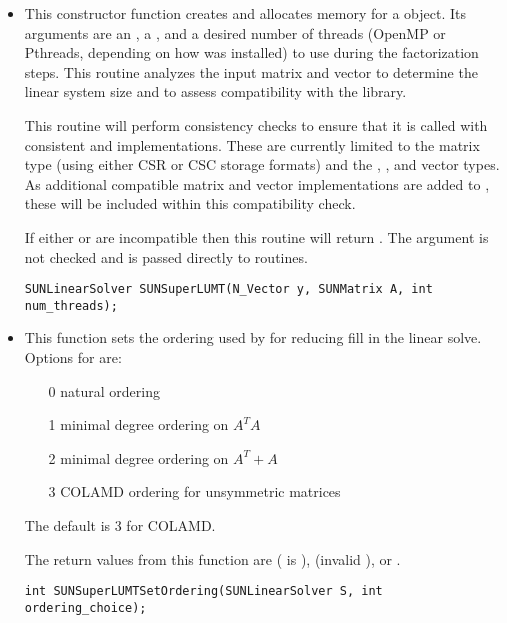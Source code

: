 \begin{itemize}


\item {}

  This constructor function creates and allocates memory for a {\sunlinsolslumt}
  object.  Its arguments are an {\nvector}, a {\sunmatrix}, and a
  desired number of threads (OpenMP or Pthreads, depending on how
  {\superlumt} was installed) to use during the factorization steps.
  This routine analyzes the input matrix and vector to determine the
  linear system size and to assess compatibility with the {\superlumt}
  library.

  This routine will perform consistency checks to ensure that it is
  called with consistent {\nvector} and {\sunmatrix} implementations.
  These are currently limited to the {\sunmatsparse} matrix type
  (using either CSR or CSC storage formats) and the {\nvecs},
  {\nvecopenmp}, and {\nvecpthreads} vector types.  As additional
  compatible matrix and vector implementations are added to
  {\sundials}, these will be included within this compatibility
  check. 

  If either  or  are incompatible then this routine will
  return .  The  argument is not checked
  and is passed directly to {\superlumt} routines.

  \verb|SUNLinearSolver SUNSuperLUMT(N_Vector y, SUNMatrix A, int num_threads);|


\item {}

  This function sets the ordering used by {\superlumt} for reducing fill in
  the linear solve.  Options for  are:
  \begin{itemize}
  \item[0] natural ordering
  \item[1] minimal degree ordering on $A^TA$
  \item[2] minimal degree ordering on $A^T+A$
  \item[3] COLAMD ordering for unsymmetric matrices
  \end{itemize}
  The default is 3 for COLAMD.

  The return values from this function are 
  ( is ), 
  (invalid ), or .
  
  \verb|int SUNSuperLUMTSetOrdering(SUNLinearSolver S, int ordering_choice);|

\end{itemize}
